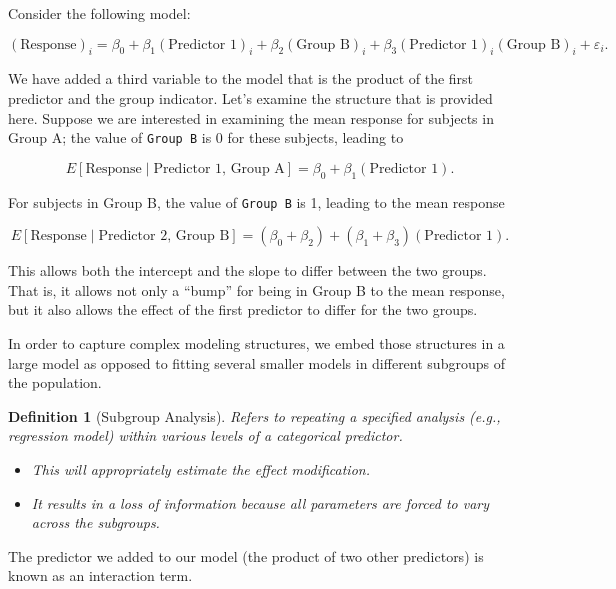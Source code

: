 \documentclass[
]{book}
\providecommand{\tightlist}{%
  \setlength{\itemsep}{0pt}\setlength{\parskip}{0pt}}
\theoremstyle{plain}
\theoremstyle{mydefn}
\newtheorem{definition}{Definition}[chapter]
\theoremstyle{myexmpl}
\theoremstyle{remark}
\begin{document}
Consider the following model:

\[(\text{Response})_i = \beta_0 + \beta_1 (\text{Predictor 1})_i + \beta_2 (\text{Group B})_i + \beta_3 (\text{Predictor 1})_i (\text{Group B})_i + \varepsilon_i.\]

We have added a third variable to the model that is the product of the first predictor and the group indicator. Let's examine the structure that is provided here. Suppose we are interested in examining the mean response for subjects in Group A; the value of \texttt{Group\ B} is 0 for these subjects, leading to

\[E\left[\text{Response} \mid \text{Predictor 1, Group A}\right] = \beta_0 + \beta_1 (\text{Predictor 1}).\]

For subjects in Group B, the value of \texttt{Group\ B} is 1, leading to the mean response

\[E\left[\text{Response} \mid \text{Predictor 2, Group B}\right] = \left(\beta_0 + \beta_2\right) + \left(\beta_1 + \beta_3\right) (\text{Predictor 1}).\]

This allows both the intercept and the slope to differ between the two groups. That is, it allows not only a ``bump'' for being in Group B to the mean response, but it also allows the effect of the first predictor to differ for the two groups.

\begin{rmdkeyidea}
In order to capture complex modeling structures, we embed those structures in a large model as opposed to fitting several smaller models in different subgroups of the population.
\end{rmdkeyidea}

\begin{definition}[Subgroup Analysis]
\protect\hypertarget{def:defn-subgroup-analysis}{}{\label{def:defn-subgroup-analysis} {} }Refers to repeating a specified analysis (e.g., regression model) within various levels of a categorical predictor.

\begin{itemize}
\tightlist
\item
  This will appropriately estimate the effect modification.
\item
  It results in a loss of information because \emph{all parameters} are forced to vary across the subgroups.
\end{itemize}
\end{definition}

The predictor we added to our model (the product of two other predictors) is known as an interaction term.
\end{document}
